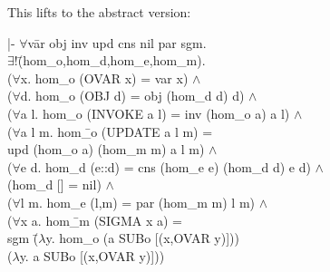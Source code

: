 \documentclass[envcountsame,runningheads]{llncs}
\begin{document}
This lifts to the abstract version:
{\tt \begin{tabbing}
|- $\forall$v\=ar obj inv upd cns nil par sgm. \\
\>   $\exists !$\=(hom\_o,hom\_d,hom\_e,hom\_m). \\
\>\>   ($\forall$x. hom\_o (OVAR x) = var x) $\wedge$ \\
\>\>   ($\forall$d. hom\_o (OBJ d) = obj (hom\_d d) d) $\wedge$ \\
\>\>   ($\forall$a l. hom\_o (INVOKE a l) = inv (hom\_o a) a l) $\wedge$ \\
\>\>   ($\forall$a l m. hom\=\_o (UPDATE a l m) = \\
\>\>\>             upd (hom\_o a) (hom\_m m) a l m) $\wedge$ \\
\>\>   ($\forall$e d. hom\_d (e::d) = cns (hom\_e e) (hom\_d d) e d) $\wedge$ \\
\>\>   (hom\_d [] = nil) $\wedge$ \\
\>\>   ($\forall$l m. hom\_e (l,m) = par (hom\_m m) l m) $\wedge$ \\
\>\>   ($\forall$x a. hom\=\_m (SIGMA x a) = \\
\>\>\>           sgm \=($\lambda$y. hom\_o (a SUBo [(x,OVAR y)])) \\
\>\>\>\>             ($\lambda$y. a SUBo [(x,OVAR y)]))
\end{tabbing}}
%
\end{document}
